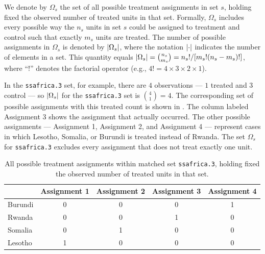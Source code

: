\documentclass[
  12pt,
  leqno]{article}
\DeclarePairedDelimiter\abs{\lvert}{\rvert}
\begin{document}
We denote by \(\Omega_s\) the set of all possible treatment assignments
in set \(s\), holding fixed the observed number of treated units in that
set. Formally, \(\Omega_s\) includes every possible way the \(n_s\)
units in set \(s\) could be assigned to treatment and control such that
exactly \(m_s\) units are treated. The number of possible assignments in
\(\Omega_s\) is denoted by \(\abs{\Omega_s}\), where the notation
\(\abs{\cdot}\) indicates the number of elements in a set. This quantity
equals
\(\abs{\Omega_s} = \binom{n_s}{m_s} = n_s! / [m_s! (n_s - m_s)!]\),
where ``!'' denotes the factorial operator (e.g.,
\(4! = 4 \times 3 \times 2 \times 1\)).

In the \texttt{ssafrica.3} set, for example, there are \(4\)
observations --- \(1\) treated and \(3\) control --- so
\(\abs{\Omega_s}\) for the \texttt{ssafrica.3} set is
\(\binom{4}{1} = 4\). The corresponding set of possible assignments with
this treated count is shown in . The
column labeled Assignment 3 shows the assignment that actually occurred.
The other possible assignments --- Assignment 1, Assignment 2, and
Assignment 4 --- represent cases in which Lesotho, Somalia, or Burundi
is treated instead of Rwanda. The set \(\Omega_s\) for
\texttt{ssafrica.3} excludes every assignment that does not treat
exactly one unit.

\singlespacing
\begin{table}[htbp]
\centering
\begin{tabular}{l|cccc}
\hline
 & Assignment 1 & Assignment 2 & Assignment 3 & Assignment 4
 \\
\hline
Burundi & 0 & 0 & 0 & 1 \\
Rwanda & 0 & 0 & 1 & 0 \\
Somalia & 0 & 1 & 0 & 0 \\
Lesotho & 1 & 0 & 0 & 0 \\
\hline
\end{tabular}
\caption{All possible treatment assignments within matched set \texttt{ssafrica.3}, holding fixed the observed number of treated units in that set.}
\label{tab: ssafrica.3 assignments}
\end{table}
\doublespacing

\FloatBarrier
\end{document}
